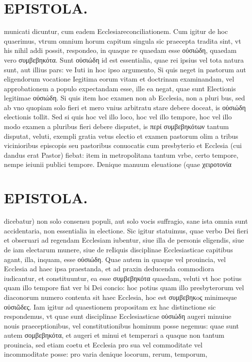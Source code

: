 \documentclass{article}
\begin{document}
\begin{pages}
\section*{EPISTOLA. }\pstart municati dicuntur, cum eadem Ecclesiareconciliationem. Cum igitur de hoc quaerimus, vtrum omnium horum capitum singula sic praecepta tradita sint, vt his nihil addi possit, respondeo, in quaque re quaedam esse οὐσιώδη, quaedam vero συμβεβηκότα. Sunt οὐσιώδη id est essentialia, quae rei ipsius vel tota natura sunt, aut illius pars: ve Iuti in hoc ipso argumento, Si quis neget in pastorum aut eligendorum vocatione Iegitima eorum vitam et doctrinam examinandam, vel approbationem a populo expectandam esse, ille ea negat, quae sunt Electionis legitimae οὐσιώδη. Si quis item hoc examen non ab Ecclesia, non a pluri bus, sed ab vno quopiam solo fieri et mero vnius arbitratu stare debere doceat, is οὐσιώδη electionis tollit. Sed si quis hoc vel illo loco, hoc vel illo tempore, hoc vel illo modo examen a pluribus  fieri debere disputet, is περί συμβεβηκότων tantum disputat, veluti, exempli gratia vetus electio et examen pastorum olim a tribus vicinioribus episcopis seu pastoribus conuocatis cum presbyterio et Ecclesia (cui dandus erat Pastor) fiebat: item in metropolitana tantum vrbe, certo tempore, nempe ieiunii publici tempore. Denique manuum eleuatione (quae χειροτονία  \pend
\section*{EPISTOLA. }\pstart dicebatur) non solo consensu populi, aut solo vocis suffragio, sane ista omnia sunt accidentaria, non essentialia in electione. Sic igitur statuimus, quae verbo Dei fieri et obseruari ad regendam Ecclesiam iubentur, siue illa de personis eligendis, siue de iam electarum munere, siue de reIiquis disciplinae Ecclesiasticae capitibus agant, illa, inquam, esse οὐσιώδη. Quae autem in quaque vel prouincia, vel Ecclesia ad haec ipsa praestanda, et ad praxin deducenda commodiora iudicantur, et constituuntur, ea esse συμβεβηκότα quaedam, veluti vt hoc potius quam illo tempore fiat ver bi Dei concio: hoc potius quam illo presbyterorum vel diaconorum numero contenta sit haec Ecclesia, hoc est συμβεβηκoς minimeque οὐσιῶδες. Iam igitur ad quaestionem propositam ex hac distinctione sic respondemus, vt quae sunt disciplinae Ecclesiasticae οὐσιώδη augeri minuiue nouis praeceptionibus, vel constitutionibus hominum posse negemus: quae sunt autem σομβεβηκότα, et augeri et minui et temperari a quaque non tantum prouincia, sed etiam coetu et Ecclesia pro sua vel commoditate vel incommoditate posse: pro varia denique locorum, rerum, temporum,  \pend

\end{pages}
\end{document}
